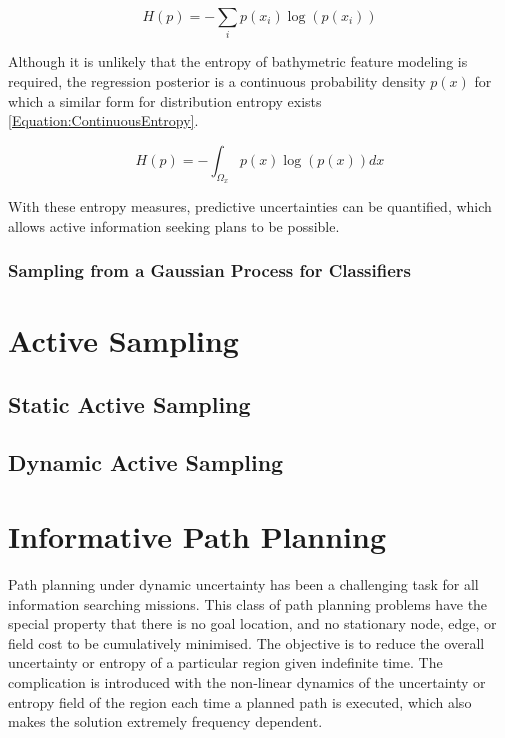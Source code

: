 				\begin{equation}
					H(p) = - \sum_{i} p(x_{i}) \log(p(x_{i}))
				\label{Equation:DiscreteEntropy}
				\end{equation}
				
				Although it is unlikely that the entropy of bathymetric feature modeling is required, the regression posterior is a continuous probability density $p(x)$ for which a similar form for distribution entropy exists \eqref{Equation:ContinuousEntropy}.
				
				\begin{equation}
					H(p) = - \int_{\Omega_{x}} p(x) \log(p(x)) dx
				\label{Equation:ContinuousEntropy}
				\end{equation}
								
				With these entropy measures, predictive uncertainties can be quantified, which allows active information seeking plans to be possible.
				
			\subsubsection{Sampling from a Gaussian Process for Classifiers}
			\label{Background:GaussianProcesses:Classification:Sampling}
			
	\section{Active Sampling}
	\label{Background:ActiveSampling}
	
		\subsection{Static Active Sampling}
		\label{Background:ActiveSampling:Static}
		
		\subsection{Dynamic Active Sampling}
		\label{Background:ActiveSampling:Dynamic}
		
	\section{Informative Path Planning}
	\label{Background:InformativePathPlanning}
	
		Path planning under dynamic uncertainty has been a challenging task for all information searching missions. This class of path planning problems have the special property that there is no goal location, and no stationary node, edge, or field cost to be cumulatively minimised. The objective is to reduce the overall uncertainty or entropy of a particular region given indefinite time. The complication is introduced with the non-linear dynamics of the uncertainty or entropy field of the region each time a planned path is executed, which also makes the solution extremely frequency dependent.
		
